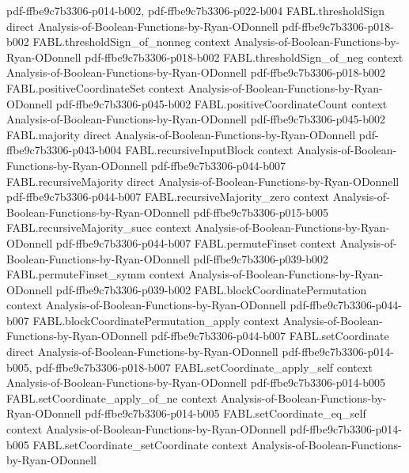 \begin{theorem}
  {pdf-ffbe9c7b3306-p014-b002,
    pdf-ffbe9c7b3306-p022-b004}
\proofstep
  {FABL.thresholdSign}
  {direct}
  {Analysis-of-Boolean-Functions-by-Ryan-ODonnell}
  {pdf-ffbe9c7b3306-p018-b002}
\proofstep
  {FABL.thresholdSign_of_nonneg}
  {context}
  {Analysis-of-Boolean-Functions-by-Ryan-ODonnell}
  {pdf-ffbe9c7b3306-p018-b002}
\proofstep
  {FABL.thresholdSign_of_neg}
  {context}
  {Analysis-of-Boolean-Functions-by-Ryan-ODonnell}
  {pdf-ffbe9c7b3306-p018-b002}
\proofstep
  {FABL.positiveCoordinateSet}
  {context}
  {Analysis-of-Boolean-Functions-by-Ryan-ODonnell}
  {pdf-ffbe9c7b3306-p045-b002}
\proofstep
  {FABL.positiveCoordinateCount}
  {context}
  {Analysis-of-Boolean-Functions-by-Ryan-ODonnell}
  {pdf-ffbe9c7b3306-p045-b002}
\proofstep
  {FABL.majority}
  {direct}
  {Analysis-of-Boolean-Functions-by-Ryan-ODonnell}
  {pdf-ffbe9c7b3306-p043-b004}
\proofstep
  {FABL.recursiveInputBlock}
  {context}
  {Analysis-of-Boolean-Functions-by-Ryan-ODonnell}
  {pdf-ffbe9c7b3306-p044-b007}
\proofstep
  {FABL.recursiveMajority}
  {direct}
  {Analysis-of-Boolean-Functions-by-Ryan-ODonnell}
  {pdf-ffbe9c7b3306-p044-b007}
\proofstep
  {FABL.recursiveMajority_zero}
  {context}
  {Analysis-of-Boolean-Functions-by-Ryan-ODonnell}
  {pdf-ffbe9c7b3306-p015-b005}
\proofstep
  {FABL.recursiveMajority_succ}
  {context}
  {Analysis-of-Boolean-Functions-by-Ryan-ODonnell}
  {pdf-ffbe9c7b3306-p044-b007}
\proofstep
  {FABL.permuteFinset}
  {context}
  {Analysis-of-Boolean-Functions-by-Ryan-ODonnell}
  {pdf-ffbe9c7b3306-p039-b002}
\proofstep
  {FABL.permuteFinset_symm}
  {context}
  {Analysis-of-Boolean-Functions-by-Ryan-ODonnell}
  {pdf-ffbe9c7b3306-p039-b002}
\proofstep
  {FABL.blockCoordinatePermutation}
  {context}
  {Analysis-of-Boolean-Functions-by-Ryan-ODonnell}
  {pdf-ffbe9c7b3306-p044-b007}
\proofstep
  {FABL.blockCoordinatePermutation_apply}
  {context}
  {Analysis-of-Boolean-Functions-by-Ryan-ODonnell}
  {pdf-ffbe9c7b3306-p044-b007}
\proofstep
  {FABL.setCoordinate}
  {direct}
  {Analysis-of-Boolean-Functions-by-Ryan-ODonnell}
  {pdf-ffbe9c7b3306-p014-b005,
    pdf-ffbe9c7b3306-p018-b007}
\proofstep
  {FABL.setCoordinate_apply_self}
  {context}
  {Analysis-of-Boolean-Functions-by-Ryan-ODonnell}
  {pdf-ffbe9c7b3306-p014-b005}
\proofstep
  {FABL.setCoordinate_apply_of_ne}
  {context}
  {Analysis-of-Boolean-Functions-by-Ryan-ODonnell}
  {pdf-ffbe9c7b3306-p014-b005}
\proofstep
  {FABL.setCoordinate_eq_self}
  {context}
  {Analysis-of-Boolean-Functions-by-Ryan-ODonnell}
  {pdf-ffbe9c7b3306-p014-b005}
\proofstep
  {FABL.setCoordinate_setCoordinate}
  {context}
  {Analysis-of-Boolean-Functions-by-Ryan-ODonnell}

\end{theorem}
